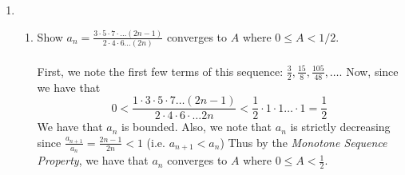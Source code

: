 \documentclass[12pt,letterpaper]{article}
\newcommand{\N}{\mathbb{N}}
\theoremstyle{case}
\theoremstyle{definition}
\begin{document}
\begin{enumerate}
\begin{enumerate}
\begin{proof}
		\end{proof}
		Now, we want to show that $ (a_n) $ is monotone decreasing; that is, we want to show that $(a_1 \geq a_2 \geq \dots \geq a_n)$.
		\begin{proof}
			We want to show that $(a_1 \geq a_2 \geq \dots \geq a_n),\ \forall\ n \in \N$. We prove this by method of mathematical induction.
			\\\\\textbf{Basis Step:} Since $5 \geq 3$, we have that $a_1 \geq a_2$.
			\\\\\textbf{Inductive Step:} Assume $a_n \geq a_{n+1}\ \forall\ n \in \N$.
			\\\\\textbf{Show:} We want to show that $a_{n+1} \geq a_{n+2}\ \forall\ n \in \N$. So,
			\begin{align*}
				a_{n+2} &= \sqrt{4+a_{n+1}} &\text{by the definition of the sequence} \\
				&\leq \sqrt{4+a_n} &\text{by the inductive hypothesis} \\
				&=a_{n+1}
			\end{align*}
			Thus we have that $a_{n+1} \geq a_{n+2}\ \forall\ n \in \N$.
		\end{proof}
	Since $(a_n)$ is both bounded and monotone decreasing, by the \textit{Monotone Convergence Theorem}, we have that $(a_n)$ converges. Also by the \textit{Monotone Sequence Property}, we have that $(a_n)$ converges to the following:
	\begin{align*}
		\lim (a_n) &= \inf \{a_n: n \in \N\} \\
		&= \frac{1}{2}+\frac{\sqrt{17}}{2} \approx 2.56155281281
	\end{align*}
	\end{enumerate}
	
	\item 
	\begin{enumerate}
		\item Show $a_n=\frac{3 \cdot 5 \cdot 7 \cdot \dots (2n-1)}{2 \cdot 4 \cdot 6 \dots (2n)}$ converges to $A$ where $0 \leq A < 1/2$.
		\\\\First, we note the first few terms of this sequence: $\frac{3}{2}, \frac{15}{8}, \frac{105}{48}, \dots$. Now, since we have that 
		\[0 <\frac{1 \cdot 3 \cdot 5 \cdot 7 \dots (2n-1)}{2 \cdot 4 \cdot 6 \cdot \dots 2n}<\frac{1}{2} \cdot 1 \cdot 1 \dots \cdot 1=\frac{1}{2}\]
		We have that $a_n$ is bounded. Also, we note that $a_n$ is strictly decreasing since $\frac{a_{n+1}}{a_n}=\frac{2n-1}{2n}<1$ (i.e. $a_{n+1}<a_n$) Thus by the \textit{Monotone Sequence Property}, we have that $a_n$ converges to $A$ where $0 \leq A < \frac{1}{2}$.
		

\end{enumerate}
\end{enumerate}
\end{document}
